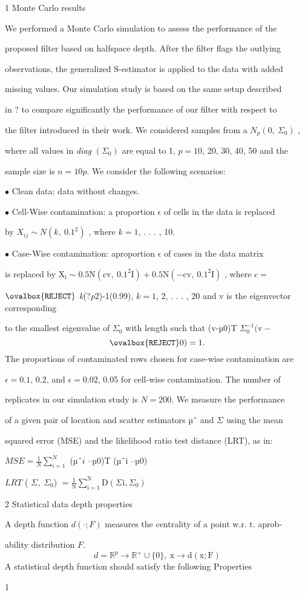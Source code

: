\documentclass[a4paper,12pt]{article}
\begin{document}
1 Monte Carlo results

We performed a Monte Carlo simulation to assess the performance of the

proposed filter based on halfspace depth. After the filter flags the outlying

observations, the generalized $\mathrm{S}$-estimator is applied to the data with added

missing values. Our simulation study is based on the same setup described

in ? to compare significantly the performance of our filter with respect to

the filter introduced in their work. We considered samples from a $N_{p}(0,\ \Sigma_{0})$ ,

where all values in {\it diag} $(\Sigma_{0})$ are equal to 1, $p = 10$, 20, 30, 40, 50 and the

sample size is $n=10p$. We consider the following scenarios:

$\bullet$ Clean data: data without changes.

$\bullet$ Cell-Wise contamination: a proportion $\epsilon$ of cells in the data is replaced

by $X_{ij}\sim N(k,\ 0.1^{2})$ , where $k=1$, . . . , 10.

$\bullet$ Case-Wise contamination: aproportion $\epsilon$ of cases in the data matrix

is replaced by $\mathrm{X}_{\mathrm{i}} \sim 0.5\mathrm{N}(\mathrm{c}\mathrm{v},\ 0.1^{2}\mathrm{I})+0.5\mathrm{N}(-\mathrm{c}\mathrm{v},\ 0.1^{2}\mathrm{I})$ , where $c=$

$\ovalbox{\tt\small REJECT}$ {\it k}(?{\it p}2)-1(0.99), $k=1$, 2, . . . , 20 and $\mathrm{v}$ is the eigenvector corresponding

to the smallest eigenvalue of $\Sigma_{0}$ with length such that (v-µ0)T $\Sigma_{0}^{-1}(\mathrm{v}-$
$$
\ovalbox{\tt\small REJECT} 0)=1.
$$
The proportions of contaminated rows chosen for case-wise contamination are

$\epsilon= 0.1$, 0.2, and $\epsilon= 0.02$, 0.05 for cell-wise contamination. The number of

replicates in our simulation study is $N=200$. We measure the performance

of a given pair of location and scatter estimators µˆ and $\Sigma^{}$ using the mean

squared error (MSE) and the likelihood ratio test distance (LRT), as in:
\begin{center}
$MSE=\displaystyle \frac{1}{N}\sum_{i=1}^{N}$ (µˆ$i$ --µ0)T (µˆi --µ0)

$LRT$ ( $\Sigma^{},\ \Sigma_{0}$) $=\displaystyle \frac{1}{\mathrm{N}}\sum_{\mathrm{i}=1}^{\mathrm{N}}\mathrm{D} (\Sigma^{} \mathrm{i}, \Sigma_{0})$
\end{center}
2 Statistical data depth properties

A depth function $d(\cdot;F)$ measures the centrality of a point w.r. $\mathrm{t}$. aprob-

ability distribution $F.$
$$
d=\mathbb{R}^{p}\rightarrow \mathbb{R}^{+}\cup\{0\},\ \mathrm{x}\rightarrow \mathrm{d}(\mathrm{x};\mathrm{F})
$$
A statistical depth function should satisfy the following Properties

1
\end{document}

